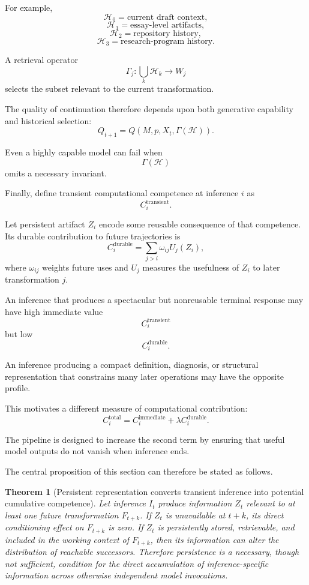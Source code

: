 \documentclass[11pt]{article}
\newtheorem{theorem}[definition]{Theorem}
\begin{document}
For example,
\[
    \mathcal{H}_0
    =
    \text{current draft context},
\]
\[
    \mathcal{H}_1
    =
    \text{essay-level artifacts},
\]
\[
    \mathcal{H}_2
    =
    \text{repository history},
\]
\[
    \mathcal{H}_3
    =
    \text{research-program history}.
\]

A retrieval operator
\[
    \Gamma_j:
    \bigcup_k\mathcal{H}_k
    \rightarrow
    W_j
\]
selects the subset relevant to the current transformation.

The quality of continuation therefore depends upon both generative capability and historical selection:
\[
    Q_{t+1}
    =
    Q(
        M,
        p,
        X_t,
        \Gamma(\mathcal{H})
    ).
\]

Even a highly capable model can fail when
\[
    \Gamma(\mathcal{H})
\]
omits a necessary invariant.

Finally, define transient computational competence at inference \(i\) as
\[
    C_i^{\mathrm{transient}}.
\]

Let persistent artifact \(Z_i\) encode some reusable consequence of that competence. Its durable contribution to future trajectories is
\[
    C_i^{\mathrm{durable}}
    =
    \sum_{j>i}
    \omega_{ij}
    U_j(Z_i),
\]
where \(\omega_{ij}\) weights future uses and \(U_j\) measures the usefulness of \(Z_i\) to later transformation \(j\).

An inference that produces a spectacular but nonreusable terminal response may have high immediate value
\[
    C_i^{\mathrm{transient}}
\]
but low
\[
    C_i^{\mathrm{durable}}.
\]

An inference producing a compact definition, diagnosis, or structural representation that constrains many later operations may have the opposite profile.

This motivates a different measure of computational contribution:
\[
    C_i^{\mathrm{total}}
    =
    C_i^{\mathrm{immediate}}
    +
    \lambda
    C_i^{\mathrm{durable}}.
\]

The pipeline is designed to increase the second term by ensuring that useful model outputs do not vanish when inference ends.

The central proposition of this section can therefore be stated as follows.

\begin{theorem}[Persistent representation converts transient inference into potential cumulative competence]
Let inference \(I_t\) produce information \(Z_t\) relevant to at least one future transformation \(F_{t+k}\). If \(Z_t\) is unavailable at \(t+k\), its direct conditioning effect on \(F_{t+k}\) is zero. If \(Z_t\) is persistently stored, retrievable, and included in the working context of \(F_{t+k}\), then its information can alter the distribution of reachable successors. Therefore persistence is a necessary, though not sufficient, condition for the direct accumulation of inference-specific information across otherwise independent model invocations.
\end{theorem}
\end{document}
